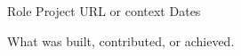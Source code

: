 

\begin{cventries}

  \cventry
    {Role} %
    {Project} %
    {URL or context} %
    {Dates} %
    {
      \begin{cvitems}
        \item {What was built, contributed, or achieved.}
      \end{cvitems}
    }

\end{cventries}
